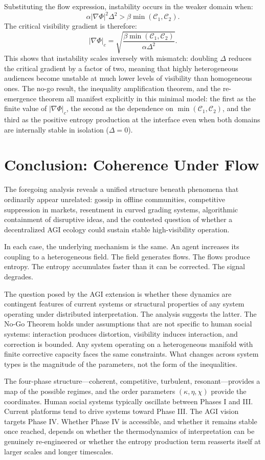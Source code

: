\documentclass[12pt,a4paper]{article}
\begin{document}
Substituting the flow expression, instability occurs in the weaker domain when:
\[
\alpha |\nabla \Phi|^2 \Delta^2 > \beta \min(\mathcal{C}_1, \mathcal{C}_2).
\]
The critical visibility gradient is therefore:
\[
|\nabla \Phi|_c = \sqrt{\frac{\beta\min(\mathcal{C}_1, \mathcal{C}_2)}{\alpha \Delta^2}}.
\]
This shows that instability scales inversely with mismatch: doubling $\Delta$ reduces the critical gradient by a factor of two, meaning that highly heterogeneous audiences become unstable at much lower levels of visibility than homogeneous ones. The no-go result, the inequality amplification theorem, and the re-emergence theorem all manifest explicitly in this minimal model: the first as the finite value of $|\nabla\Phi|_c$, the second as the dependence on $\min(\mathcal{C}_1, \mathcal{C}_2)$, and the third as the positive entropy production at the interface even when both domains are internally stable in isolation ($\Delta = 0$).

\section{Conclusion: Coherence Under Flow}


The foregoing analysis reveals a unified structure beneath phenomena that ordinarily appear unrelated: gossip in offline communities, competitive suppression in markets, resentment in curved grading systems, algorithmic containment of disruptive ideas, and the contested question of whether a decentralized AGI ecology could sustain stable high-visibility operation.

In each case, the underlying mechanism is the same. An agent increases its coupling to a heterogeneous field. The field generates flows. The flows produce entropy. The entropy accumulates faster than it can be corrected. The signal degrades.

The question posed by the AGI extension is whether these dynamics are contingent features of current systems or structural properties of any system operating under distributed interpretation. The analysis suggests the latter. The No-Go Theorem holds under assumptions that are not specific to human social systems: interaction produces distortion, visibility induces interaction, and correction is bounded. Any system operating on a heterogeneous manifold with finite corrective capacity faces the same constraints. What changes across system types is the magnitude of the parameters, not the form of the inequalities.

The four-phase structure---coherent, competitive, turbulent, resonant---provides a map of the possible regimes, and the order parameters $(\kappa, \eta, \chi)$ provide the coordinates. Human social systems typically oscillate between Phases I and III. Current platforms tend to drive systems toward Phase III. The AGI vision targets Phase IV. Whether Phase IV is accessible, and whether it remains stable once reached, depends on whether the thermodynamics of interpretation can be genuinely re-engineered or whether the entropy production term reasserts itself at larger scales and longer timescales.
\end{document}
